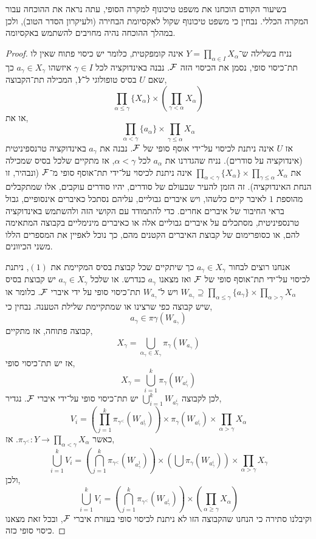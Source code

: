 בשיעור הקודם הוכחנו את משפט טיכונוף למקרה הסופי, עתה נראה את ההוכחה עבור המקרה הכללי.
נבחין כי משפט טיכונוף שקול לאקסיומת הבחירה (ולעיקרון הסדר הטוב), ולכן במהלך ההוכחה נהיה מחויבים להשתמש באקסיומה.
\begin{proof}
	נניח בשלילה ש־$Y = \prod_{\alpha \in I} X_{\alpha}$ אינה קומפקטית,
	כלומר יש כיסוי פתוח שאין לו תת־כיסוי סופי, נסמן את הכיסוי הזה $\mathcal{F}$.
	נבנה באינדוקציה לכל $\gamma \in I$ איזשהו $a_{\gamma} \in X_{\gamma}$ כך שאם $U$ בסיס טופולוגי ל־$Y$,
	המכילה תת־הקבוצה,
	\[
		\prod_{\alpha \le \gamma} \{ X_{\alpha} \} \times \left( \prod_{\gamma < \alpha} X_{\alpha}\right)
		\tag{1}
	\]
	או את,
	\[
		\prod_{\alpha < \gamma} \{ a_{\alpha} \} \times \prod_{\gamma \le \alpha} X_{\alpha}
		\tag{2}
	\]
	אז $U$ אינה ניתנת לכיסוי על־ידי אוסף סופי של $\mathcal{F}$.
	נבנה את $a_{\gamma}$ באינדוקציה טרנספיניטית (אינדוקציה על סודרים).
	נניח שהגדרנו את $a_{\alpha}$ לכל $\alpha < \gamma$,
	אז מתקיים שלכל בסיס שמכילה את $\prod_{\alpha < \gamma} \{ X_{\alpha} \} \times \prod_{\gamma \le \alpha} X_{\alpha}$ אינה ניתנת לכיסוי על־ידי תת־אוסף סופי מ־$\mathcal{F}$ (ונבהיר, זו הנחת האינדוקציה).
	זה הזמן להעיר שבעולם של סודרים, יהיו סודרים עוקבים, אלו שמתקבלים מהוספת $1$ לאיבר קיים כלשהו, ויש איברים גבוליים, עליהם נסתכל כאיברים אינסופיים, גבול בראי החיבור של איברים אחרים.
	כדי להתמודד עם הקושי הזה ולהשתמש באינדוקציה טרנספיניטית, מסתכלים על איברים גבוליים אלה או כאיברים מינימליים בקבוצה המתאימה להם, או כסופרימום של קבוצת האיברים הקטנים מהם, כך נוכל לאפיין את המספרים הללו משני הכיוונים.

	אנחנו רוצים לבחור $a_{\gamma} \in X_{\gamma}$ כך שיתקיים שכל קבוצת בסיס המקיימת את $(1)$,
	ניתנת לכיסוי על־ידי תת־אוסף סופי של $\mathcal{F}$ ואז מצאנו $a_{\gamma}$ כנדרש.
	או שלכל $a_{\gamma} \in X_{\gamma}$ יש קבוצת בסיס $W_{a_{\gamma}} \supseteq \prod_{\alpha \le \gamma} \{ a_{\gamma} \} \times \prod_{\alpha > \gamma} X_{\alpha}$ ויש ל־$W_{a_{\gamma}}$ תת־כיסוי סופי על ידי איברי $\mathcal{F}$.
	כלומר או שיש קבוצה כפי שרצינו או שמתקיימת שלילת הטענה.
	נבחין כי,
	\[
		a_{\gamma} \in \pi{\gamma}(W_{a_{\gamma}})
	\]
	קבוצה פתוחה, אז מתקיים,
	\[
		X_{\gamma} = \bigcup_{\alpha_{\gamma} \in X_{\gamma}} \pi_{\gamma}(W_{a_{\gamma}})
	\]
	אז יש תת־כיסוי סופי,
	\[
		X_{\gamma} = \bigcup_{i = 1}^k \pi_{\gamma}(W_{a_{\gamma}^i})
	\]
	לכן לקבוצה $\bigcup_{i = 1}^k W_{a_{\gamma}^i}$ יש תת־כיסוי סופי על־ידי איברי $\mathcal{F}$.
	נגדיר,
	\[
		V_i
		= \left( \prod_{j = 1}^k \pi_{\gamma^<}(W_{a_{\gamma}^i}) \right) \times \pi_{\gamma}(W_{a_{\gamma}^i}) \times \prod_{\alpha > \gamma} X_{\alpha}
	\]
	כאשר $\pi_{\gamma^<} : Y \to \prod_{\alpha < \gamma} X_{\alpha}$.
	אז,
	\[
		\bigcup_{i = 1}^k V_i
		= \left( \bigcap_{j = 1}^k \pi_{\gamma^<}(W_{a_{\gamma}^j}) \right) \times \left( \bigcup \pi_{\gamma}(W_{a_{\gamma}^i}) \right) \times \prod_{\alpha > \gamma} X_{\gamma}
	\]
	ולכן,
	\[
		\bigcup_{i = 1}^k V_i
		= \left( \bigcap_{j = 1}^k \pi_{\gamma^<}(W_{a_{\gamma}^i}) \right) \times \left(\prod_{\alpha \ge \gamma} X_{\alpha} \right)
	\]
	וקיבלנו סתירה כי הנחנו שהקבוצה הזו לא ניתנת לכיסוי סופי בעזרת איברי $\mathcal{F}$, ובכל זאת מצאנו כיסוי סופי כזה.


\end{proof}
